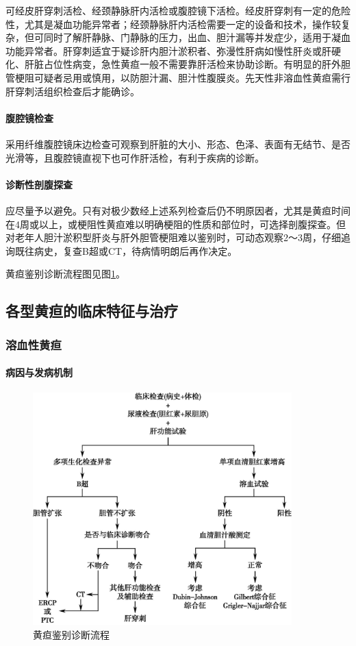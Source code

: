 可经皮肝穿刺活检、经颈静脉肝内活检或腹腔镜下活检。经皮肝穿刺有一定的危险性，尤其是凝血功能异常者；经颈静脉肝内活检需要一定的设备和技术，操作较复杂，但可同时了解肝静脉、门静脉的压力，出血、胆汁漏等并发症少，适用于凝血功能异常者。肝穿刺适宜于疑诊肝内胆汁淤积者、弥漫性肝病如慢性肝炎或肝硬化、肝脏占位性病变，急性黄疸一般不需要靠肝活检来协助诊断。有明显的肝外胆管梗阻可疑者忌用或慎用，以防胆汁漏、胆汁性腹膜炎。先天性非溶血性黄疸需行肝穿刺活组织检查后才能确诊。

\paragraph{腹腔镜检查}

采用纤维腹腔镜床边检查可观察到肝脏的大小、形态、色泽、表面有无结节、是否光滑等，且腹腔镜直视下也可作肝活检，有利于疾病的诊断。

\paragraph{诊断性剖腹探查}

应尽量予以避免。只有对极少数经上述系列检查后仍不明原因者，尤其是黄疸时间在4周或以上，或梗阻性黄疸难以明确梗阻的性质和部位时，可选择剖腹探查。但对老年人胆汁淤积型肝炎与肝外胆管梗阻难以鉴别时，可动态观察2～3周，仔细追询既往病史，复查B超或CT，待病情明朗后再作决定。

黄疸鉴别诊断流程图见图\ref{fig16-1}。

\subsection{各型黄疸的临床特征与治疗}

\subsubsection{溶血性黄疸}

\paragraph{病因与发病机制}

\begin{figure}[!htbp]
 \centering
 \includegraphics[width=3.9375in,height=3.54167in]{./images/Image00062.jpg}
 \captionsetup{justification=centering}
 \caption{黄疸鉴别诊断流程}
 \label{fig16-1}
  \end{figure} 

